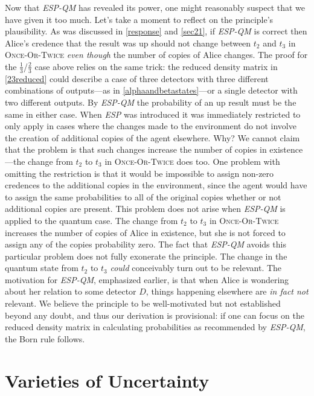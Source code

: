 \documentclass[12pt,onecolumn,secnumarabic,amsmath,amssymb,balancelastpage,nofootinbib]{article}
\begin{document}
Now that \emph{ESP-QM} has revealed its power, one might reasonably suspect that we have given it too much.  Let's take a moment to reflect on the principle's plausibility.  As was discussed in \textsection \ref{response} and \ref{sec21}, if \emph{ESP-QM} is correct then Alice's credence that the result was up should not change between $t_2$ and $t_3$ in \textsc{Once-Or-Twice} \emph{even though} the number of copies of Alice changes.  The proof for the $\frac{1}{3}$/$\frac{2}{3}$ case above relies on the same trick: the reduced density matrix in \eqref{23reduced} could describe a case of three detectors with three different combinations of outputs---as in \eqref{alphaandbetastates}---or a single detector with two different outputs.  By \emph{ESP-QM} the probability of an up result must be the same in either case.  When \emph{ESP} was introduced it was immediately restricted to only apply in cases where the changes made to the environment do not involve the creation of additional copies of the agent elsewhere.  Why?  We cannot claim that the problem is that such changes increase the number of copies in existence---the change from $t_2$ to $t_3$ in \textsc{Once-Or-Twice} does too.  One problem {with omitting the restriction is that it would be} impossible to assign non-zero credences to the additional copies in the environment, since the agent {would have to} assign the same probabilities to all of the original copies whether or not additional copies are present.  This problem does not arise when \emph{ESP-QM} is applied to the quantum case.  The change from $t_2$ to $t_3$ in \textsc{Once-Or-Twice} increases the number of copies of Alice in existence, but she is not forced to assign any of the copies probability zero.  The fact that \emph{ESP-QM} avoids this particular problem does not fully exonerate the principle.  The change in the quantum state from $t_2$ to $t_3$ \emph{could} conceivably turn out to be relevant.  The motivation for \emph{ESP-QM}, emphasized earlier, is that when Alice is wondering about her relation to some detector $D$, things happening elsewhere are \emph{in fact not} relevant.  We believe the principle to be well-motivated but not established beyond any doubt, and thus our derivation is provisional: if one can focus on the reduced density matrix in calculating probabilities as recommended by \emph{ESP-QM}, the Born rule follows.


\section{Varieties of Uncertainty}\label{varieties}
\end{document}
